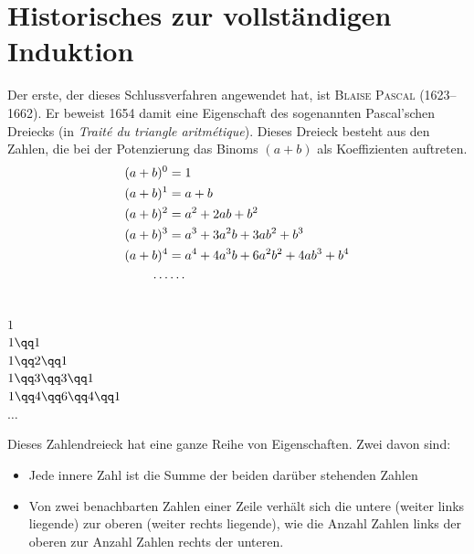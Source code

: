\documentclass[%
11pt,%
twoside,%
titlepage,%
swissgerman,%
headsepline%
]{scrartcl}
\newcommand{\definition}[1]{\colorbox{emerald}{#1}}
\theoremstyle{definition}
\theoremstyle{plain}
\begin{document}
\section{Historisches zur vollst\"andigen Induktion}
Der erste, der dieses Schlussverfahren angewendet hat, ist \textsc{Blaise
Pascal} (1623--1662).
Er beweist 1654 damit eine Eigenschaft des sogenannten
\definition{Pascal'schen Dreiecks} (in \emph{Traité du triangle aritmétique}).
Dieses Dreieck besteht aus den Zahlen, die bei der Potenzierung das
Binoms $(a+b)$ als Koeffizienten auftreten.
  \begin{align}
    (a+b)^0 &= 1\notag\\
    (a+b)^1 &= a+b\notag\\
    (a+b)^2 &= a^2+2ab+b^2\notag\\
    (a+b)^3 &= a^3+3a^2b+3ab^2+b^3\notag\\
    (a+b)^4 &= a^4+4a^3b+6a^2b^2+4ab^3+b^4\notag\\
    \dots &\dots\notag
  \end{align}

  \begin{center}
    \ \\[2pt]
    $1$\\[6pt]
    $1\qq1$\\[6pt]
    $1\qq2\qq1$\\[6pt]
    $1\qq3\qq3\qq1$\\[6pt]
    $1\qq4\qq6\qq4\qq1$\\[6pt]
    $\dots$
  \end{center}

\noindent Dieses Zahlendreieck hat eine ganze Reihe von
Eigenschaften. Zwei davon sind:
\begin{itemize}
  \item Jede innere Zahl ist die Summe der beiden dar\"uber stehenden
  Zahlen
  \item Von zwei benachbarten Zahlen einer Zeile verh\"alt sich die
  untere (weiter links liegende) zur oberen (weiter rechts
  liegende), wie die Anzahl Zahlen links der oberen zur Anzahl
  Zahlen rechts der unteren. 
\end{itemize}
\end{document}
